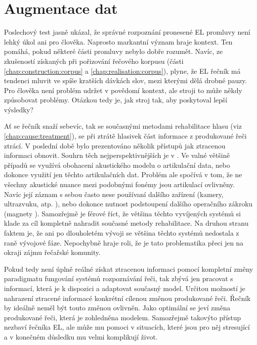 \section{Augmentace dat}
\label{chap:realisation:augmentation}

Poslechový test jasně ukázal, že správné rozpoznání pronesené EL promluvy není lehký úkol ani pro člověka. Naprosto markantní význam hraje kontext. Ten pomáhá, pokud některé části promluvy nebylo dobře rozumět. Navíc, ze zkušeností získaných při pořizování řečového korpusu (části \ref{chap:construction:corpus} a \ref{chap:realisation:corpus}), plyne, že EL řečník má tendenci mluvit ve spíše kratších dávkách slov, mezi kterými dělá drobné pauzy. Pro člověka není problém udržet v povědomí kontext, ale stroji to může někdy způsobovat problémy. Otázkou tedy je, jak  stroj tak, aby poskytoval lepší výsledky?

Ať se řečník snaží sebevíc, tak se současnými metodami rehabilitace hlasu (viz \ref{chap:cause:treatment}), se při ztrátě hlasivek část informace z produkované řeči ztrácí. V poslední době bylo prezentováno několik přístupů jak ztracenou informaci obnovit. Souhrn těch nejperspektivnějších je v \cite{Denby2010}. Ve valné většině případů se využívá obohacení akustického modelu o artikulační data, nebo dokonce využití jen těchto artikulačních dat. \cite{Hofe2013} Problém ale spočívá v tom, že ne všechny akustické nuance mezi podobnými fonémy jsou artikulací ovlivněny. Navíc její záznam s sebou často nese používaní dalšího zařízení (kamery, ultrazvuku, atp. \cite{Hueber2010}), nebo dokonce nutnost podstoupení dalšího operačního zákroku (magnety \cite{Hofe2011}). Samozřejmě je férové říct, že většina těchto vyvíjených systémů si klade za cíl kompletně nahradit současné metody rehabilitace. Na druhou stranu faktem je, že ani po dlouholetém vývoji se většina těchto systémů nedostala z raně vývojové fáze. Nepochybně hraje roli, že je tato problematika přeci jen na okraji zájmu řečařské komunity.

Pokud tedy není úplně reálné získat ztracenou informaci pomocí kompletní změny paradigmatu fungování systémů rozpoznávání řeči, tak zbývá jen pracovat s informací, která je k dispozici a adaptovat současný model. Určitou možností je nahrazení ztracené informacé konkrétní cílenou změnou produkované řeči. Řečník by ideálně neměl být touto změnou ovlivněn. Jako optimální se jeví změna produkované řeči, která je zohledněna modelem. Samozřejmě takovýto přístup nezbaví řečníka EL, ale může mu pomoci v situacích, které jsou pro něj stresující a v konečném důsledku mu velmi komplikují život.

